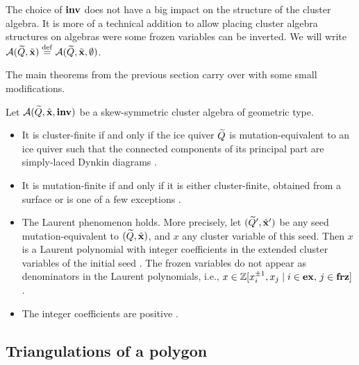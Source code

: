 \begin{remark}

	The choice of $\mathbf{inv}$ does not have a big impact on the structure of the cluster
	algebra. It is more of a technical addition to allow placing cluster algebra structures
	on algebras were some frozen variables can be inverted. We will write $\mathcal{A}(\widetilde{Q}, \tilde{\mathbf{x}})
		\overset{\mathrm{def}}{=} \mathcal{A}(\widetilde{Q}, \tilde{\mathbf{x}}, \emptyset)$.
\end{remark}

The main theorems from the previous section carry over with some small modifications.
\begin{theorem}

	Let $\mathcal{A}(\widetilde{Q}, \tilde{\mathbf{x}}, \mathbf{inv})$ be a skew-symmetric cluster algebra of geometric type.
	\begin{itemize}
		\item It is cluster-finite if and only if the ice quiver $\widetilde{Q}$ is mutation-equivalent to an
		      ice quiver such that the connected components of its principal part are simply-laced
		      Dynkin diagrams \cite{FominZelevinsky2003CAFin}.
		\item It is mutation-finite if and only if it is either cluster-finite, obtained from a
		      surface or is one of a few exceptions \cite{FeliksonPavel2023cluster}.
		\item The Laurent phenomenon holds. More precisely, let $(\widetilde{Q}', \tilde{\mathbf{x}}')$ be any seed
		      mutation-equivalent to $(\widetilde{Q}, \tilde{\mathbf{x}})$, and $x$ any cluster variable of this seed. Then
		      $x$ is a Laurent polynomial with integer coefficients in the extended cluster variables
		      of the initial seed \cite{FominZelevinsky2002CAF}. The frozen variables do not appear
		      as denominators in the Laurent polynomials, i.e., $x \in \mathbb{Z}[x_i^{\pm 1}, x_j \mid i
			      \in \mathbf{ex},\, j \in \mathbf{frz}]$ \cite[Theorem 3.3.6]{FominWilliams2021IntroductionCA_1-3}.
		\item The integer coefficients are positive
		      \parencite{LeeSchiffler2015PositivityCA}.
	\end{itemize}
\end{theorem}

\subsection{Triangulations of a polygon}\label{sec:triangulations_revisited}

